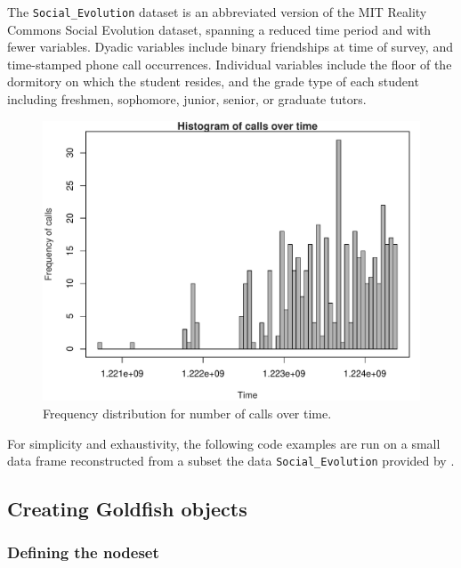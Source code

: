\documentclass[article]{jss}
\begin{document}
The \texttt{Social\_Evolution} dataset is an abbreviated version of the MIT Reality Commons Social Evolution dataset, spanning a reduced time period and with fewer variables. Dyadic variables include binary friendships at time of survey, and time-stamped phone call occurrences. Individual variables include the floor of the dormitory on which the student resides, and the grade type of each student including freshmen, sophomore, junior, senior, or graduate tutors.



\FloatBarrier
\begin{figure}[h!]
\centering
\includegraphics{article-histogram1}
\caption{\label{fig:callstime1} Frequency distribution for number of calls over time.}
\end{figure}
\FloatBarrier



%
%

For simplicity and exhaustivity, the following code examples are run on a small data frame reconstructed from a subset the data \texttt{Social\_Evolution} provided by . 

% 


\subsection[Creating Goldfish objects]{Creating Goldfish objects} \label{subsec:Goldfish_effects}

\subsubsection[Defining the nodeset]{\textbf{Defining the nodeset}} \label{subsubsec:nodeset}
\end{document}
